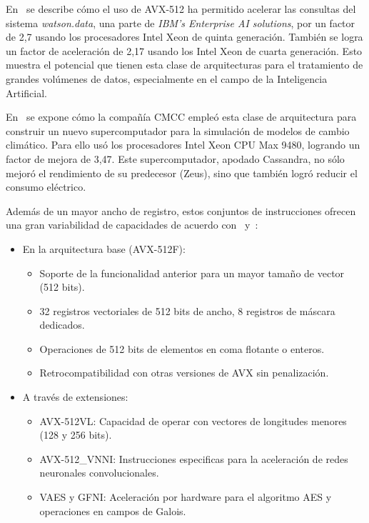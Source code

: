 En~\cite{avx-ibm} se describe cómo el uso de AVX-512 ha permitido acelerar las
consultas del sistema \textit{watson.data}, una parte de \textit{IBM's Enterprise AI
solutions}, por un factor de 2,7 usando los procesadores Intel Xeon de quinta
generación. También se logra un factor de aceleración de 2,17 usando los Intel
Xeon de cuarta generación. Esto muestra el potencial que tienen esta clase de
arquitecturas para el tratamiento de grandes volúmenes de datos, especialmente
en el campo de la Inteligencia Artificial.

En~\cite{avx-cmcc} se expone cómo la compañía CMCC empleó esta clase de
arquitectura para construir un nuevo supercomputador para la simulación de
modelos de cambio climático. Para ello usó los procesadores Intel Xeon CPU Max
9480, logrando un factor de mejora de 3,47. Este supercomputador, apodado
Cassandra, no sólo mejoró el rendimiento de su predecesor (Zeus), sino que
también logró reducir el consumo eléctrico.

Además de un mayor ancho de registro, estos conjuntos de instrucciones ofrecen
una gran variabilidad de capacidades de acuerdo con~\cite{vector_research} y~\cite{intel-avx512-2}:

\begin{itemize}
    \item En la arquitectura base (AVX-512F): 
    \begin{itemize}
        \item Soporte de la funcionalidad anterior para un mayor tamaño de vector (512 bits).
        \item 32 registros vectoriales de 512 bits de ancho, 8 registros de máscara dedicados.
        \item Operaciones de 512 bits de elementos en coma flotante o enteros.
        \item Retrocompatibilidad con otras versiones de AVX sin penalización.
    \end{itemize}
    \item A través de extensiones:
    \begin{itemize}
        \item AVX-512VL\@: Capacidad de operar con vectores de longitudes menores (128 y 256 bits).
        \item AVX-512\_VNNI\@: Instrucciones especificas para la aceleración de redes neuronales convolucionales.
        \item VAES y GFNI\@: Aceleración por hardware para el algoritmo AES y operaciones en campos de Galois.
    \end{itemize}
\end{itemize}

